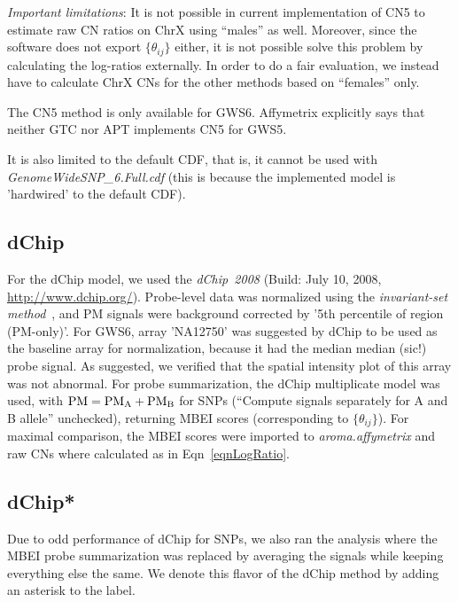 \documentclass[10pt,a4paper]{article}
\newcommand{\GWSSix}{GWS6\xspace}
\newcommand{\PMA}{\ensuremath{\textnormal{PM}_\textnormal{A}}\xspace}
\newcommand{\PMB}{\ensuremath{\textnormal{PM}_\textnormal{B}}\xspace}
\newcommand{\filename}[1]{\textit{#1}\xspace}
\newcommand{\pkg}[1]{\textit{#1}\xspace}
\newcommand{\PM}{\textnormal{PM}\xspace}
\newcommand{\citep}[1]{\cite{#1}}
\begin{document}
\textit{Important limitations}:
It is not possible in current implementation of CN5 to estimate raw CN ratios on ChrX using ``males'' as well.  Moreover, since the software does not export $\{\theta_{ij}\}$ either, it is not possible solve this problem by calculating the log-ratios externally.  In order to do a fair evaluation, we instead have to calculate ChrX CNs for the other methods based on ``females'' only.

The CN5 method is only available for \GWSSix.  Affymetrix explicitly says that neither GTC nor APT implements CN5 for GWS5.

It is also limited to the default CDF, that is, it cannot be used with \filename{GenomeWideSNP\_6.Full.cdf} (this is because the implemented model is 'hardwired' to the default CDF).



\subsection{dChip}
For the dChip model, we used the \pkg{dChip~2008} (Build: July 10, 2008, \url{http://www.dchip.org/}).  Probe-level data was normalized using the \emph{invariant-set method}~\citep{LiWong_2001}, and PM signals were background corrected by '5th percentile of region (PM-only)'.  For GWS6, array 'NA12750' was suggested by dChip to be used as the baseline array for normalization, because it had the median median (sic!) probe signal.  As suggested, we verified that the spatial intensity plot of this array was not abnormal.
For probe summarization, the dChip multiplicate model was used, with $\PM=\PMA+\PMB$ for SNPs (``Compute signals separately for A and B allele'' unchecked), returning MBEI scores (corresponding to $\{\theta_{ij}\}$).  For maximal comparison, the MBEI scores were imported to \pkg{aroma.affymetrix} and raw CNs where calculated as in Eqn~\eqref{eqnLogRatio}.


\subsection{dChip*}
Due to odd performance of dChip for SNPs, we also ran the analysis where the MBEI probe summarization was replaced by averaging the signals while keeping everything else the same.  We denote this flavor of the dChip method by adding an asterisk to the label.
\end{document}
